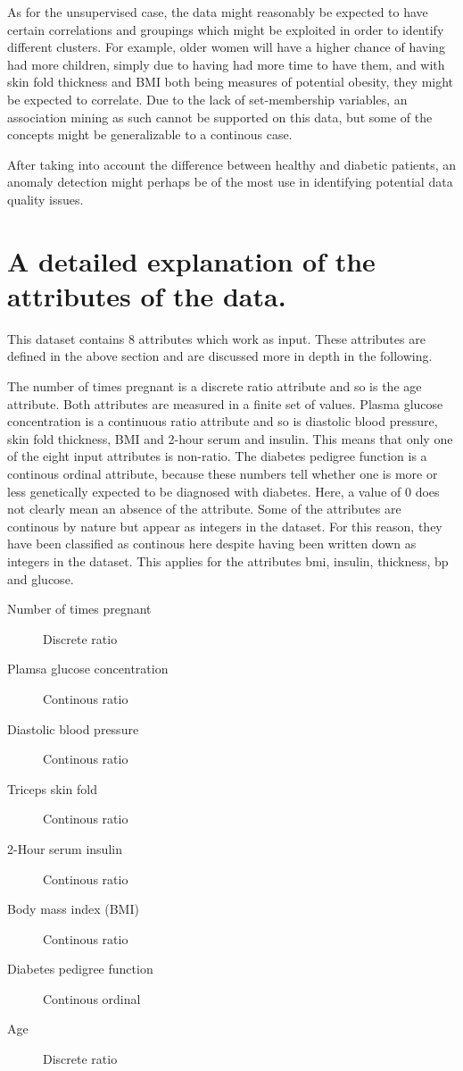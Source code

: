As for the unsupervised case,
the data might reasonably be expected to have certain correlations
and groupings
which might be exploited
in order to identify different clusters.
For example, older women will have a higher chance of having had more children,
simply due to having had more time to have them,
and with skin fold thickness and BMI both being measures of potential obesity,
they might be expected to correlate.
Due to the lack of set-membership variables,
an association mining as such cannot be supported on this data,
but some of the concepts might be generalizable to a continous case.

After taking into account the difference between healthy and diabetic patients,
an anomaly detection might perhaps be of the most use in identifying
potential data quality issues.

\section{A detailed explanation of the attributes of the data.}

This dataset contains 8 attributes which work as input. These attributes are defined in
the above section and are discussed more in depth in the following.

The number of times pregnant is a discrete ratio attribute and so is
the age attribute. Both attributes are measured in a finite set of values.
Plasma glucose concentration is a continuous ratio attribute
and so is diastolic blood pressure, skin fold thickness, BMI and 2-hour serum and
insulin. This means that only one of the eight input attributes is non-ratio.
The diabetes pedigree function is a continous ordinal attribute, because these
numbers tell whether one is more or less genetically expected to be diagnosed
with diabetes. Here, a value of 0 does not clearly mean an absence of the attribute.
Some of the attributes are continous by nature but appear as integers in the dataset.
For this reason, they have been classified as continous here despite having been written
down as integers in the dataset. This applies for the attributes bmi, insulin,
thickness, bp and glucose.
\bigskip

\begin{description}
\item [Number of times pregnant] Discrete ratio
\item [Plamsa glucose concentration] Continous ratio
\item [Diastolic blood pressure] Continous ratio
\item [Triceps skin fold] Continous ratio
\item [2-Hour serum insulin] Continous ratio
\item [Body mass index (BMI)] Continous ratio
\item [Diabetes pedigree function] Continous ordinal
\item [Age] Discrete ratio
\end{description}


